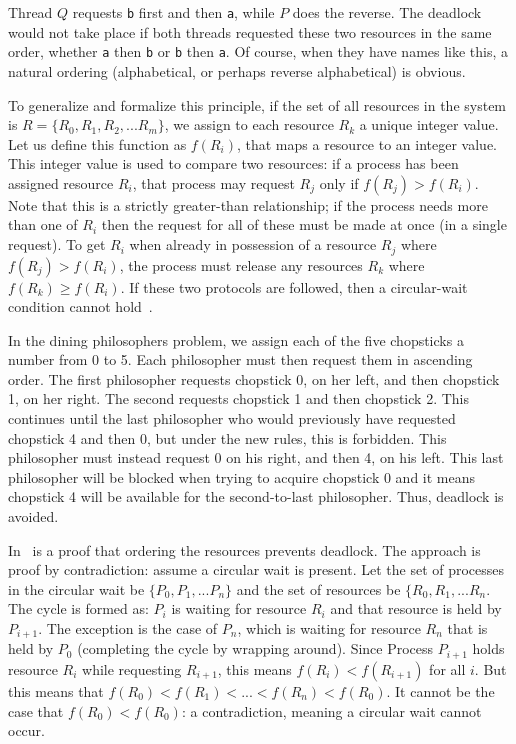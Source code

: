 Thread $Q$ requests \texttt{b} first and then \texttt{a}, while $P$ does the reverse. The deadlock would not take place if both threads requested these two resources in the same order, whether \texttt{a} then \texttt{b} or \texttt{b} then \texttt{a}. Of course, when they have names like this, a natural ordering (alphabetical, or perhaps reverse alphabetical) is obvious. 

To generalize and formalize this principle, if the set of all resources in the system is $R = \{R_{0}, R_{1}, R_{2}, ... R_{m}\}$, we assign to each resource $R_{k}$ a unique integer value. Let us define this function as $f(R_{i})$, that maps a resource to an integer value. This integer value is used to compare two resources: if a process has been assigned resource $R_{i}$, that process may request $R_{j}$ only if $f(R_{j}) > f(R_{i})$. Note that this is a strictly greater-than relationship; if the process needs more than one of $R_{i}$ then the request for all of these must be made at once (in a single request). To get $R_{i}$ when already in possession of a resource $R_{j}$ where $f(R_{j}) > f(R_{i})$, the process must release any resources $R_{k}$ where $f(R_{k}) \geq f(R_{i})$. If these two protocols are followed, then a circular-wait condition cannot hold~\cite{osc}.

In the dining philosophers problem, we assign each of the five chopsticks a number from 0 to 5. Each philosopher must then request them in ascending order. The first philosopher requests chopstick 0, on her left, and then chopstick 1, on her right. The second requests chopstick 1 and then chopstick 2. This continues until the last philosopher who would previously have requested chopstick 4 and then 0, but under the new rules, this is forbidden. This philosopher must instead request 0 on his right, and then 4, on his left. This last philosopher will be blocked when trying to acquire chopstick 0 and it means chopstick 4 will be available for the second-to-last philosopher. Thus, deadlock is avoided.

In~\cite{osc} is a proof that ordering the resources prevents deadlock. The approach is proof by contradiction: assume a circular wait is present. Let the set of processes in the circular wait be $\{P_{0}, P_{1}, ... P_{n}\}$ and the set of resources be $\{R_{0}, R_{1}, ... R_{n}$. The cycle is formed as: $P_{i}$ is waiting for resource $R_{i}$ and that resource is held by $P_{i+1}$. The exception is the case of $P_{n}$, which is waiting for resource $R_{n}$ that is held by $P_{0}$ (completing the cycle by wrapping around). Since Process $P_{i+1}$ holds resource $R_{i}$ while requesting $R_{i+1}$, this means $f(R_{i}) < f(R_{i+1})$ for all $i$. But this means that $f(R_{0}) < f(R_{1}) < ... < f(R_{n}) < f(R_{0})$. It cannot be the case that $f(R_{0}) < f(R_{0})$: a contradiction, meaning a circular wait cannot occur.

